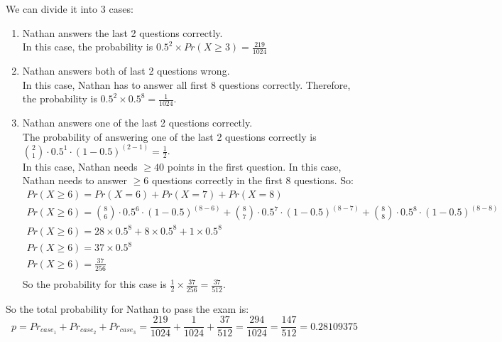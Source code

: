 \documentclass{article}
\begin{document}
We can divide it into 3 cases:
\begin{enumerate}
\item Nathan answers the last 2 questions correctly.\\
In this case, the probability is \( 0.5^2 \times Pr(X \geq 3) = \frac{219}{1024} \)
\item Nathan answers both of last 2 questions wrong.\\
In this case, Nathan has to answer all first 8 questions correctly. Therefore, the probability is \( 0.5^2 \times 0.5^8 = \frac{1}{1024}\).
\item Nathan answers one of the last 2 questions correctly.\\
The probability of answering one of the last 2 questions correctly is \( {2 \choose 1} \cdot 0.5^1 \cdot (1-0.5)^{(2-1)}= \frac{1}{2} \). \\
In this case, Nathan needs \( \geq 40 \) points in the first question. In this case, Nathan needs to answer \( \geq 6 \) questions correctly in the first 8 questions. So:
\[
\begin{array}{ll}
Pr(X \geq 6) = Pr(X = 6) + Pr(X = 7) + Pr(X = 8) \\
Pr(X \geq 6) = {8 \choose 6} \cdot 0.5^6 \cdot (1-0.5)^{(8-6)} + {8 \choose 7} \cdot 0.5^7 \cdot (1-0.5)^{(8-7)} + {8 \choose 8} \cdot 0.5^8 \cdot (1-0.5)^{(8-8)} \\
Pr(X \geq 6) = 28 \times 0.5^8 + 8 \times 0.5^8 +  1 \times 0.5^8 \\
Pr(X \geq 6) = 37 \times 0.5^8 \\
Pr(X \geq 6) = \frac{37}{256} \\
\end{array}
\]
So the probability for this case is \( \frac{1}{2} \times \frac{37}{256} = \frac{37}{512} \).
\end{enumerate}


So the total probability for Nathan to pass the exam is:
\[
p = Pr_{case_1} + Pr_{case_2} + Pr_{case_3} = \frac{219}{1024} + \frac{1}{1024} + \frac{37}{512} = \frac{294}{1024} = \frac{147}{512} = 0.28109375
\]
\end{document}
